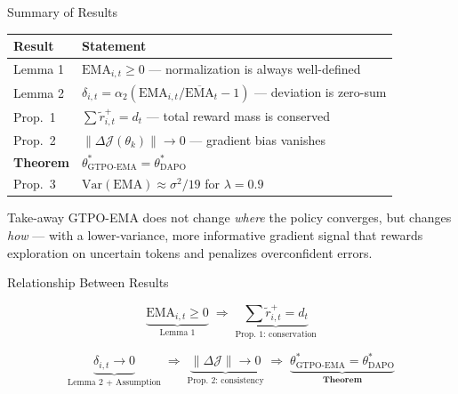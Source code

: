 \documentclass[aspectratio=169, 11pt]{beamer}
\newcommand{\EMA}{\mathrm{EMA}}
\newcommand{\GEMA}{\overline{\mathrm{EMA}}}
\begin{document}
\begin{frame}{Summary of Results}

\begin{center}
\begin{tabular}{@{}lp{7.5cm}@{}}
\toprule
\textbf{Result} & \textbf{Statement} \\
\midrule
Lemma 1 & $\EMA_{i,t} \geq 0$ — normalization is always well-defined \\[4pt]
Lemma 2 & $\delta_{i,t} = \alpha_2(\EMA_{i,t}/\GEMA_t - 1)$ — deviation is zero-sum \\[4pt]
Prop.\ 1 & $\sum \tilde{r}^+_{i,t} = d_t$ — total reward mass is conserved \\[4pt]
Prop.\ 2 & $\|\Delta\mathcal{J}(\theta_k)\| \to 0$ — gradient bias vanishes \\[4pt]
\textbf{Theorem} & $\theta^*_{\text{GTPO-EMA}} = \theta^*_{\text{DAPO}}$ \\[4pt]
Prop.\ 3 & $\mathrm{Var}(\EMA) \approx \sigma^2/19$ for $\lambda=0.9$ \\
\bottomrule
\end{tabular}
\end{center}

\medskip
\begin{block}{Take-away}
GTPO-EMA does not change \emph{where} the policy converges,
but changes \emph{how} — with a lower-variance, more informative
gradient signal that rewards exploration on uncertain tokens
and penalizes overconfident errors.
\end{block}

\end{frame}

\begin{frame}{Relationship Between Results}

\begin{center}
\large
\[
\underbrace{\EMA_{i,t} \geq 0}_{\text{Lemma 1}}
\;\Rightarrow\;
\underbrace{\textstyle\sum \tilde{r}^+_{i,t} = d_t}_{\text{Prop.\ 1: conservation}}
\]

\bigskip

\[
\underbrace{\delta_{i,t} \to 0}_{\text{Lemma 2 + Assumption}}
\;\Rightarrow\;
\underbrace{\|\Delta\mathcal{J}\| \to 0}_{\text{Prop.\ 2: consistency}}
\;\Rightarrow\;
\underbrace{\theta^*_{\text{GTPO-EMA}} = \theta^*_{\text{DAPO}}}_{\textbf{Theorem}}
\]
\end{center}

\end{frame}
\end{document}
